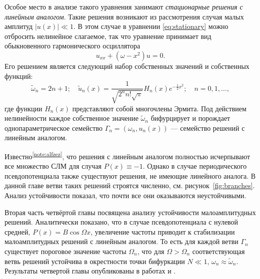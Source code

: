 \documentclass[candidate, href, colorlinks]{disser}
\begin{document}
Особое место в анализе такого уравнения занимают {\it стационарные решения с линейным аналогом}.
Такие решения возникают из рассмотрения случая малых амплитуд $|u(x)| \ll 1$.
В этом случае в уравнении \eqref{eq:stationary} можно отбросить нелинейное слагаемое, так что уравнение принимает вид обыкновенного гармонического осциллятора
\begin{equation}
	u_{xx} + (\omega - x^2) u = 0.
\end{equation}
Его решением является следующий набор собственных значений и собственных функций:
\begin{equation}
	\tilde{\omega}_n = 2n + 1; \quad \tilde{u}_n(x) = \dfrac{1}{\sqrt{2^n n! \sqrt{\pi}}} H_n(x) e^{-\frac{1}{2} x^2}; \quad n = 0, 1, \dots,
\label{eq:ho}
\end{equation}
где функции $H_n(x)$ представляют собой многочлены Эрмита.
Под действием нелинейности каждое собственное значение $\tilde{\omega}_n$ бифурцирует и порождает однопараметрическое семейство $\Gamma_n = (\omega_n, u_n(x))$ --- семейство решений с линейным аналогом.

Известно\textsuperscript{\ref{note:alfzez}}, что решения с линейным аналогом полностью исчерпывают все множество СЛМ для случая $P(x) \equiv -1$.
Однако в случае периодического псевдопотенциала также существуют решения, не имеющие линейного аналога.
В данной главе ветви таких решений строятся численно, см. рисунок~\ref{fig:branches}.
Анализ устойчивости показал, что почти все они оказываются неустойчивыми.

Вторая часть четвёртой главы посвящена анализу устойчивости малоамплитудных решений.
Аналитически показано, что в случае псевдопотенциала с нулевой средней, $P(x) = B \cos \Omega x$, увеличение частоты приводит к стабилизации малоамплитудных решений с линейным аналогом.
То есть для каждой ветви $\Gamma_n$ существует пороговое значение частоты $\Omega_n$, что для $\Omega > \Omega_n$ соответствующая ветвь решений устойчива в окрестности точки бифуркации $N \ll 1$, $\omega_n \approx \tilde{\omega}_n$.
Результаты четвертой главы опубликованы в работах \cite{AlfimovGegelLebedevMalomedZezyulin} и \cite{Bannoe2018}.
\end{document}
